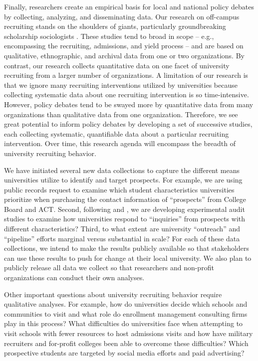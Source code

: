 \documentclass[twoside]{article}
\begin{document}
Finally, researchers create an empirical basis for local and national policy debates by collecting, analyzing, and disseminating data.  Our research on off-campus recruiting stands on the shoulders of giants, particularly groundbreaking scholarship sociologists \citep[e.g., ][]{RN3519,RN4407,RN4324}. These studies tend to broad in scope -- e.g., encompassing the recruiting, admissions, and yield process -- and are based on qualitative, ethnographic, and archival data from one or two organizations. By contrast, our research collects quantitative data on one facet of university recruiting from a larger number of organizations. A limitation of our research is that we ignore many recruiting interventions utilized by universities because collecting systematic data about one recruiting intervention is so time-intensive. However, policy debates tend to be swayed more by quantitative data from many organizations than qualitative data from one organization. Therefore, we see great potential to inform policy debates by developing a set of successive studies, each collecting systematic, quantifiable data about a particular recruiting intervention. Over time, this research agenda will encompass the breadth of university recruiting behavior.

We have initiated several new data collections to capture the different means universities utilize to identify and target prospects.  For example, we are using public records request to examine which student characteristics universities prioritize when purchasing the contact information of ``prospects'' from College Board and ACT.  Second, following \cite{RN4331} and \cite{RN4360}, we are developing experimental audit studies to examine how universities respond to ``inquiries'' from prospects with different characteristics? Third, to what extent are university ``outreach'' and ``pipeline'' efforts marginal versus substantial in scale? For each of these data collections, we intend to make the results publicly available so that stakeholders can use these results to push for change at their local university. We also plan to publicly release all data we collect so that researchers and non-profit organizations can conduct their own analyses.

Other important questions about university recruiting behavior require qualitative analyses. For example, how do universities decide which schools and communities to visit and what role do enrollment management consulting firms play in this process? What difficulties do universities face when attempting to visit schools with fewer resources to host admissions visits and how have military recruiters and for-profit colleges been able to overcome these difficulties? Which prospective students are targeted by social media efforts and paid advertising?
\end{document}

